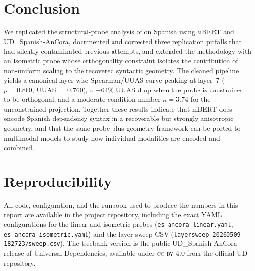 \documentclass[11pt,a4paper]{article}
\newcommand{\mbert}{\textsc{mBERT}\xspace}
\newcommand{\ancora}{UD\_Spanish-AnCora\xspace}
\newcommand{\layerbest}{7\xspace}
\begin{document}
\section{Conclusion}

We replicated the structural-probe analysis of
\citet{hewitt2019structural} on Spanish using \mbert and \ancora,
documented and corrected three replication pitfalls that had silently
contaminated previous attempts, and extended the methodology with an
isometric probe whose orthogonality constraint isolates the
contribution of non-uniform scaling to the recovered syntactic
geometry. The cleaned pipeline yields a canonical layer-wise
Spearman/UUAS curve peaking at layer~\layerbest
($\rho = 0.860$, UUAS $= 0.760$), a $-64\%$ UUAS drop when the
probe is constrained to be orthogonal, and a moderate condition
number $\kappa = 3.74$ for the unconstrained projection.
Together these results indicate that mBERT does encode Spanish
dependency syntax in a recoverable but strongly anisotropic
geometry, and that the same probe-plus-geometry framework can be
ported to multimodal models to study how individual modalities are
encoded and combined.

\section*{Reproducibility}

All code, configuration, and the runbook used to produce the numbers
in this report are available in the project repository, including the
exact YAML configurations for the linear and isometric probes
(\texttt{es\_ancora\_linear.yaml}, \texttt{es\_ancora\_isometric.yaml})
and the layer-sweep CSV (\texttt{layersweep-20260509-182723/sweep.csv}).
The treebank version is the public \ancora release
of Universal Dependencies, available under \textsc{cc by} 4.0 from the
official UD repository.
\end{document}
